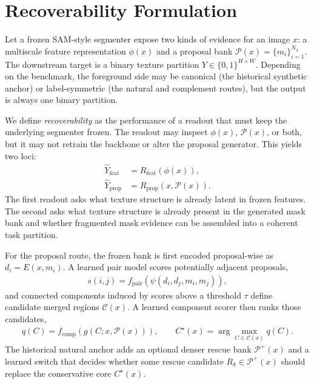 \section{Recoverability Formulation}
\label{sec:problem}

Let a frozen SAM-style segmenter expose two kinds of evidence for an image $x$: a multiscale feature representation $\phi(x)$ and a proposal bank $\mathcal{P}(x)=\{m_i\}_{i=1}^{N_x}$. The downstream target is a binary texture partition $Y \in \{0,1\}^{H\times W}$. Depending on the benchmark, the foreground side may be canonical (the historical synthetic anchor) or label-symmetric (the natural and complement routes), but the output is always one binary partition.

We define \emph{recoverability} as the performance of a readout that must keep the underlying segmenter frozen. The readout may inspect $\phi(x)$, $\mathcal{P}(x)$, or both, but it may not retrain the backbone or alter the proposal generator. This yields two loci:
\begin{align}
\hat{Y}_{\mathrm{feat}} &= R_{\mathrm{feat}}(\phi(x)), \\
\hat{Y}_{\mathrm{prop}} &= R_{\mathrm{prop}}(x, \mathcal{P}(x)).
\end{align}
The first readout asks what texture structure is already latent in frozen features. The second asks what texture structure is already present in the generated mask bank and whether fragmented mask evidence can be assembled into a coherent task partition.

For the proposal route, the frozen bank is first encoded proposal-wise as $d_i = E(x, m_i)$. A learned pair model scores potentially adjacent proposals,
\begin{align}
s(i,j) = f_{\mathrm{pair}}(\psi(d_i, d_j, m_i, m_j)),
\end{align}
and connected components induced by scores above a threshold $\tau$ define candidate merged regions $\mathcal{C}(x)$. A learned component scorer then ranks those candidates,
\begin{align}
q(C) = f_{\mathrm{comp}}(g(C; x, \mathcal{P}(x))), \qquad
C^\star(x) = \arg\max_{C \in \mathcal{C}(x)} q(C).
\end{align}
The historical natural anchor adds an optional denser rescue bank $\mathcal{P}^{+}(x)$ and a learned switch that decides whether some rescue candidate $R_k \in \mathcal{P}^{+}(x)$ should replace the conservative core $C^\star(x)$.

